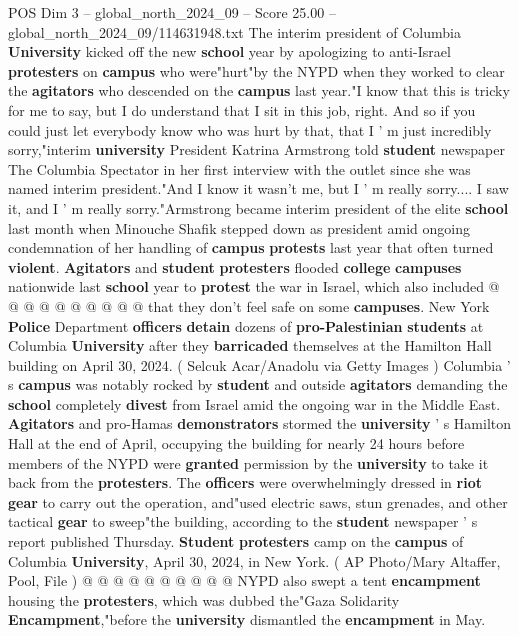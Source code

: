 \begin{textsample}{POS Dim 3 – global\_north\_2024\_09 – Score 25.00 – global\_north\_2024\_09/114631948.txt}  \label{ex:f3_pos_159}
The interim president of Columbia \textbf{University} kicked off the new \textbf{school} year by apologizing to anti-Israel \textbf{protesters} on \textbf{campus} who were"hurt"by the NYPD when they worked to clear the \textbf{agitators} who descended on the \textbf{campus} last year."I know that this is tricky for me to say, but I do understand that I sit in this job, right.
And so if you could just let everybody know who was hurt by that, that I ' m just incredibly sorry,"interim \textbf{university} President Katrina Armstrong told \textbf{student} newspaper The Columbia Spectator in her first interview with the outlet since she was named interim president."And I know it wasn't me, but I ' m really sorry....
I saw it, and I ' m really sorry."Armstrong became interim president of the elite \textbf{school} last month when Minouche Shafik stepped down as president amid ongoing condemnation of her handling of \textbf{campus} \textbf{protests} last year that often turned \textbf{violent}. \textbf{Agitators} and \textbf{student} \textbf{protesters} flooded \textbf{college} \textbf{campuses} nationwide last \textbf{school} year to \textbf{protest} the war in Israel, which also included @ @ @ @ @ @ @ @ @ @ that they don't feel safe on some \textbf{campuses}.
New York \textbf{Police} Department \textbf{officers} \textbf{detain} dozens of \textbf{pro-Palestinian} \textbf{students} at Columbia \textbf{University} after they \textbf{barricaded} themselves at the Hamilton Hall building on April 30, 2024. ( Selcuk Acar/Anadolu via Getty Images ) Columbia ' s \textbf{campus} was notably rocked by \textbf{student} and outside \textbf{agitators} demanding the \textbf{school} completely \textbf{divest} from Israel amid the ongoing war in the Middle East. \textbf{Agitators} and pro-Hamas \textbf{demonstrators} stormed the \textbf{university} ' s Hamilton Hall at the end of April, occupying the building for nearly 24 hours before members of the NYPD were \textbf{granted} permission by the \textbf{university} to take it back from the \textbf{protesters}.
The \textbf{officers} were overwhelmingly dressed in \textbf{riot} \textbf{gear} to carry out the operation, and"used electric saws, stun grenades, and other tactical \textbf{gear} to sweep"the building, according to the \textbf{student} newspaper ' s report published Thursday. \textbf{Student} \textbf{protesters} camp on the \textbf{campus} of Columbia \textbf{University}, April 30, 2024, in New York. ( AP Photo/Mary Altaffer, Pool, File ) @ @ @ @ @ @ @ @ @ @ NYPD also swept a tent \textbf{encampment} housing the \textbf{protesters}, which was dubbed the"Gaza Solidarity \textbf{Encampment},"before the \textbf{university} dismantled the \textbf{encampment} in May.

\end{textsample}
